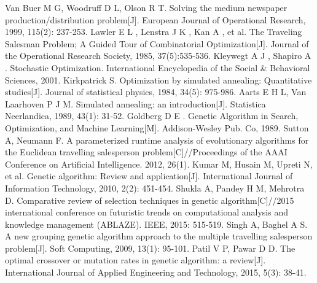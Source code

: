 \documentclass[a4paper,12pt]{article}
\begin{document}
\begin{thebibliography}{99}
 Van Buer M G, Woodruff D L, Olson R T. Solving the medium newspaper production/distribution problem[J]. European Journal of Operational Research, 1999, 115(2): 237-253.
 Lawler E L ,  Lenstra J K ,  Kan A , et al. The Traveling Salesman Problem; A Guided Tour of Combinatorial Optimization[J]. Journal of the Operational Research Society, 1985, 37(5):535-536.
 Kleywegt A J , Shapiro A . Stochastic Optimization. International Encyclopedia of the Social \& Behavioral Sciences, 2001.
 Kirkpatrick S. Optimization by simulated annealing: Quantitative studies[J]. Journal of statistical physics, 1984, 34(5): 975-986.
 Aarts E H L, Van Laarhoven P J M. Simulated annealing: an introduction[J]. Statistica Neerlandica, 1989, 43(1): 31-52.
 Goldberg D E . Genetic Algorithm in Search, Optimization, and Machine Learning[M]. Addison-Wesley Pub. Co, 1989.
 Sutton A, Neumann F. A parameterized runtime analysis of evolutionary algorithms for the Euclidean travelling salesperson problem[C]//Proceedings of the AAAI Conference on Artificial Intelligence. 2012, 26(1).
 Kumar M, Husain M, Upreti N, et al. Genetic algorithm: Review and application[J]. International Journal of Information Technology, 2010, 2(2): 451-454.
 Shukla A, Pandey H M, Mehrotra D. Comparative review of selection techniques in genetic algorithm[C]//2015 international conference on futuristic trends on computational analysis and knowledge management (ABLAZE). IEEE, 2015: 515-519.
 Singh A, Baghel A S. A new grouping genetic algorithm approach to the multiple travelling salesperson problem[J]. Soft Computing, 2009, 13(1): 95-101.
 Patil V P, Pawar D D. The optimal crossover or mutation rates in genetic algorithm: a review[J]. International Journal of Applied Engineering and Technology, 2015, 5(3): 38-41.
\end{thebibliography}
\end{document}
